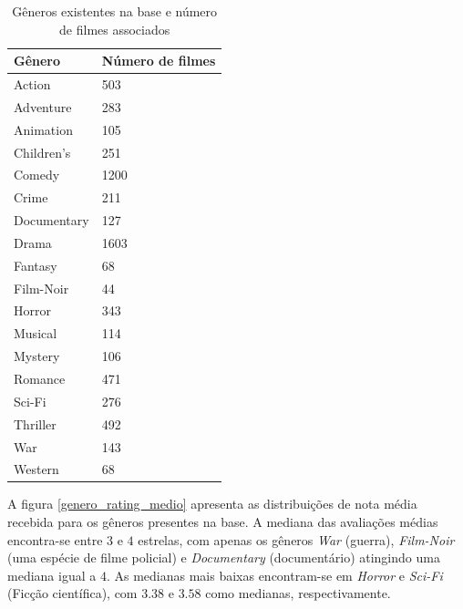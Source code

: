\documentclass[12pt,a4paper,header]{abnt}
\begin{document}
\begin{table}[!htb]
\caption{Gêneros existentes na base e número de filmes associados}
\label{generos}
\centering
\begin{tabular}{@{}ll@{}}
\\
\toprule
\textbf{Gênero} & \textbf{Número de filmes} \\ \midrule
Action          & 503                       \\
Adventure       & 283                       \\
Animation       & 105                       \\
Children's      & 251                       \\
Comedy          & 1200                      \\
Crime           & 211                       \\
Documentary     & 127                       \\
Drama           & 1603                      \\
Fantasy         & 68                        \\
Film-Noir       & 44                        \\
Horror          & 343                       \\
Musical         & 114                       \\
Mystery         & 106                       \\
Romance         & 471                       \\
Sci-Fi          & 276                       \\
Thriller        & 492                       \\
War             & 143                       \\
Western         & 68                        \\ \bottomrule
\end{tabular}
\end{table}

A figura \ref{genero_rating_medio} apresenta as distribuições de nota média recebida para os gêneros presentes na base. A mediana das avaliações médias encontra-se entre $3$ e $4$ estrelas, com apenas os gêneros \textit{War} (guerra), \textit{Film-Noir} (uma espécie de filme policial) e \textit{Documentary} (documentário) atingindo uma mediana igual a $4$. As medianas mais baixas encontram-se em \textit{Horror} e \textit{Sci-Fi} (Ficção científica), com $3.38$ e $3.58$ como medianas, respectivamente.
\end{document}
